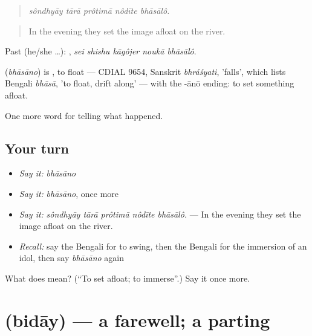 \begin{quote}
    
\end{quote}

\begin{quote}
\emph{sôndhyāy tārā prôtimā nôdīte bhāsālô.}
\end{quote}

\begin{quote}
In the evening they set the image afloat on the river.
\end{quote}

Past (he/she …):     , \emph{sei shishu kāgôjer noukā bhāsālô}.

\begin{cousinweb}
\textbf{} (\emph{bhāsāno}) is \textbf{}, to float — CDIAL 9654, Sanskrit \emph{bhráśyati}, 'falls', which lists Bengali \emph{bhāsā}, 'to float, drift along' — with the -ānō ending: to set something afloat.
\end{cousinweb}

\begin{grammarlens}[title={What you've built}]
One more word for telling what happened.
\end{grammarlens}

\subsection*{Your turn}
\begin{itemize}
\raggedright
  \item \emph{Say it:} \emph{bhāsāno}
  \item \emph{Say it:} \emph{bhāsāno}, once more
  \item \emph{Say it:} \emph{sôndhyāy tārā prôtimā nôdīte bhāsālô.} — In the evening they set the image afloat on the river.
  \item \emph{Recall:} say the Bengali for to swing, then the Bengali for the immersion of an idol, then say \emph{bhāsāno} again
\end{itemize}

\begin{tcolorbox}[breakable,colback=teal!4,colframe=teal!35!black,title={Before you move on}]
What does  mean? (\textquotedblleft{}To set afloat; to immerse\textquotedblright{}.) Say it once more.
\end{tcolorbox}
\section[\texorpdfstring{\bn{বিদায়} (bidāy)}{বিদায় (bidāy)}]{ (bidāy) — a farewell; a parting}

